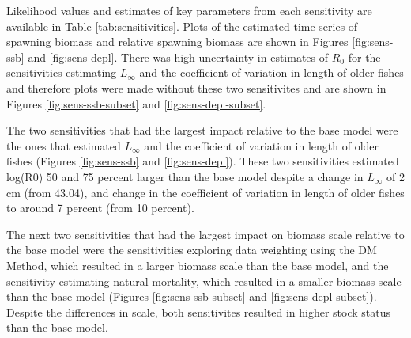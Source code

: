 \documentclass[11pt,
  english,
  a4paper,
]{article}
\begin{document}
\leavevmode\tagmcend\tagstructend\par


Likelihood values and estimates of key parameters from each sensitivity are available in Table \ref{tab:sensitivities}. Plots of the estimated time-series of spawning biomass and relative spawning biomass are shown in Figures \ref{fig:sens-ssb} and \ref{fig:sens-depl}. There was high uncertainty in estimates of {\(R_0\)\leavevmode\tagmcend\tagstructend} for the sensitivities estimating {\(L_{\infty}\)\leavevmode\tagmcend\tagstructend} and the coefficient of variation in length of older fishes and therefore plots were made without these two sensitivites and are shown in Figures \ref{fig:sens-ssb-subset} and \ref{fig:sens-depl-subset}.

\leavevmode\tagmcend\tagstructend\par


The two sensitivities that had the largest impact relative to the base model were the ones that estimated {\(L_{\infty}\)\leavevmode\tagmcend\tagstructend} and the coefficient of variation in length of older fishes (Figures \ref{fig:sens-ssb} and \ref{fig:sens-depl}). These two sensitivities estimated log(R0) 50 and 75 percent larger than the base model despite a change in {\(L_{\infty}\)\leavevmode\tagmcend\tagstructend} of 2 cm (from 43.04), and change in the coefficient of variation in length of older fishes to around 7 percent (from 10 percent).

\leavevmode\tagmcend\tagstructend\par


The next two sensitivities that had the largest impact on biomass scale relative to the base model were the sensitivities exploring data weighting using the DM Method, which resulted in a larger biomass scale than the base model, and the sensitivity estimating natural mortality, which resulted in a smaller biomass scale than the base model (Figures \ref{fig:sens-ssb-subset} and \ref{fig:sens-depl-subset}). Despite the differences in scale, both sensitivites resulted in higher stock status than the base model.
\end{document}
